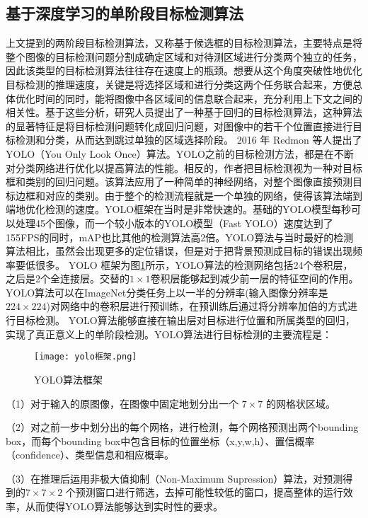 \subsection{基于深度学习的单阶段目标检测算法}
上文提到的两阶段目标检测算法，又称基于候选框的目标检测算法，主要特点是将整个图像的目标检测问题分割成确定区域和对待测区域进行分类两个独立的任务，因此该类型的目标检测算法往往存在速度上的瓶颈。想要从这个角度突破性地优化目标检测的推理速度，关键是将选择区域和进行分类这两个任务联合起来，方便总体优化时间的同时，能将图像中各区域间的信息联合起来，充分利用上下文之间的相关性。基于这些分析，研究人员提出了一种基于回归的目标检测算法，这种算法的显著特征是将目标检测问题转化成回归问题，对图像中的若干个位置直接进行目标检测和分类，从而达到跳过单独的区域选择阶段\cite{jiao2019survey,wu2020recent}。
2016 年 Redmon 等人提出了 YOLO（You Only Look Once）算法\cite{redmon2016you}。YOLO之前的目标检测方法，都是在不断对分类网络进行优化以提高算法的性能。相反的，作者把目标检测视为一种对目标框和类别的回归问题。该算法应用了一种简单的神经网络，对整个图像直接预测目标边框和对应的类别。由于整个的检测流程就是一个单独的网络，使得该算法端到端地优化检测的速度。YOLO框架在当时是非常快速的。基础的YOLO模型每秒可以处理45个图像，而一个较小版本的YOLO模型（Fast YOLO）速度达到了155FPS的同时，mAP也比其他的检测算法高2倍。YOLO算法与当时最好的检测算法相比，虽然会出现更多的定位错误，但是对于把背景预测成目标的错误出现频率要低很多。
YOLO 框架为图\ref{yk}所示，YOLO算法的检测网络包括24个卷积层，之后是2个全连接层。交替的$1\times1$卷积层能够起到减少前一层的特征空间的作用。YOLO算法可以在ImageNet分类任务上以一半的分辨率(输入图像分辨率是$224\times224$)对网络中的卷积层进行预训练，在预训练后通过将分辨率加倍的方式进行目标检测。
YOLO算法能够直接在输出层对目标进行位置和所属类型的回归，实现了真正意义上的单阶段检测。YOLO算法进行目标检测的主要流程是：

\begin{figure}[htbp]
    \centering
    \texttt{[image: yolo框架.png]}
    \caption{YOLO算法框架}
    \label{yk}
\end{figure}

（1）对于输入的原图像，在图像中固定地划分出一个 $7 \times 7$ 的网格状区域。

（2）对之前一步中划分出的每个网格，进行检测，每个网格预测出两个bounding box，而每个bounding box中包含目标的位置坐标（x,y,w,h）、置信概率（confidence）、类型信息和相应概率。

（3）在推理后运用非极大值抑制（Non-Maximum Supression）算法，对预测得到的$7 \times 7 \times 2$ 个预测窗口进行筛选，去掉可能性较低的窗口，提高整体的运行效率，从而使得YOLO算法能够达到实时性的要求。

